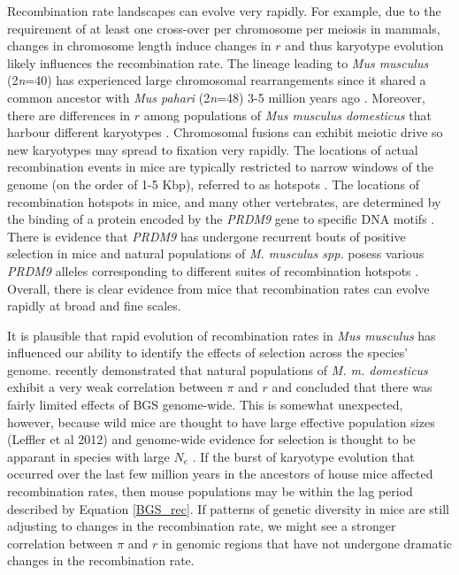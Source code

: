 \documentclass[11pt,twoside, onecolumn]{GSA_format}
\begin{document}
Recombination rate landscapes can evolve very rapidly. For example, due to the requirement of at least one cross-over per chromosome per meiosis in mammals, changes in chromosome length induce changes in $r$ and thus karyotype evolution likely influences the recombination rate. The lineage leading to \textit{Mus musculus} (2\textit{n}=40) has experienced large chromosomal rearrangements since it shared a common ancestor with \textit{Mus pahari} (2\textit{n}=48) 3-5 million years ago \citep{Thybert2018}. Moreover, there are differences in $r$ among populations of \textit{Mus musculus domesticus} that harbour different karyotypes \citep{Vara2021}. Chromosomal fusions can exhibit meiotic drive \citep{Chmatal2014} so new karyotypes may spread to fixation very rapidly. The locations of actual recombination events in mice are typically restricted to narrow windows of the genome (on the order of 1-5 Kbp), referred to as hotspots \citep{RN263}. The locations of recombination hotspots in mice, and many other vertebrates, are determined by the binding of a protein encoded by the \textit{PRDM9} gene to specific DNA motifs \citep{RN269, Baker2017}. There is evidence that \textit{PRDM9} has undergone recurrent bouts of positive selection in mice \citep{RN329} and natural populations of \textit{M. musculus spp.} posess various \textit{PRDM9} alleles corresponding to different suites of recombination hotspots \citep{RN249}. Overall, there is clear evidence from mice that recombination rates can evolve rapidly at broad and fine scales. 

\vspace{5px}

It is plausible that rapid evolution of recombination rates in \textit{Mus musculus} has influenced our ability to identify the effects of selection across the species' genome. \cite{Kartje2020} recently demonstrated that natural populations of \textit{M. m. domesticus} exhibit a very weak correlation between $\pi$ and $r$ and concluded that there was fairly limited effects of BGS genome-wide. This is somewhat unexpected, however, because wild mice are thought to have large effective population sizes (Leffler et al 2012) and genome-wide evidence for selection is thought to be apparant in species with large $N_e$ \citep{RN117}. If the burst of karyotype evolution that occurred over the last few million years in the ancestors of house mice affected recombination rates, then mouse populations may be within the lag period described by Equation \ref{BGS_rec}. If patterns of genetic diversity in mice are still adjusting to changes in the recombination rate, we might see a stronger correlation between $\pi$ and $r$ in genomic regions that have not undergone dramatic changes in the recombination rate. 
\end{document}
